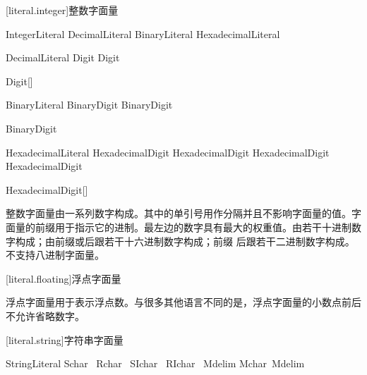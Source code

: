 [literal.integer]{整数字面量}

\begin{bnf}{IntegerLiteral}
    DecimalLiteral \br
    BinaryLiteral \br
    HexadecimalLiteral
\end{bnf}

\begin{bnf}{DecimalLiteral}
    Digit \bnflp\terminal{\textquotesingle}\bnfq Digit\bnfrp \bnfs
\end{bnf}

\begin{bnf}{Digit}[\oneof]
\end{bnf}

\begin{bnf}{BinaryLiteral}
     BinaryDigit \bnflp\terminal{\textquotesingle}\bnfq BinaryDigit\bnfrp\bnfs
\end{bnf}

\begin{bnf}{BinaryDigit}
     \br
\end{bnf}

\begin{bnf}{HexadecimalLiteral}
     HexadecimalDigit \bnflp\terminal{\textquotesingle}\bnfq HexadecimalDigit\bnfrp\bnfs
     HexadecimalDigit \bnflp\terminal{\textquotesingle}\bnfq HexadecimalDigit\bnfrp\bnfs
\end{bnf}

\begin{bnf}{HexadecimalDigit}[\oneof]
     \br
     \br
\end{bnf}

\pnum
整数字面量由一系列数字构成。其中的单引号用作分隔并且不影响字面量的值。字面量的前缀用于指示它的进制。最左边的数字具有最大的权重值。由若干十进制数字构成；由前缀或后跟若干十六进制数字构成；前缀  后跟若干二进制数字构成。\X 不支持八进制字面量。

[literal.floating]{浮点字面量}

\pnum
浮点字面量用于表示浮点数。与很多其他语言不同的是，浮点字面量的小数点前后不允许省略数字。

[literal.string]{字符串字面量}

\begin{bnf}{StringLiteral}
     Schar\bnfs\  \br
     Rchar\bnfs\  \br
     SIchar\bnfs\  \br
     RIchar\bnfs\  \br
    Mdelim Mchar\bnfs\ Mdelim
\end{bnf}

